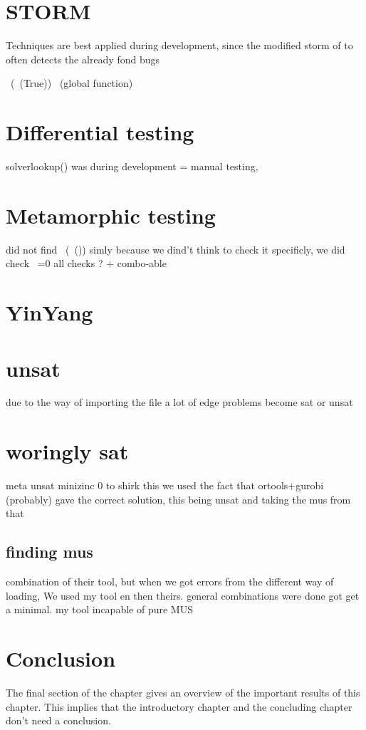 \section{STORM}
Techniques are best applied during development, since the modified storm of to often detects the already fond bugs


~(~(True))
~(global function)
\section{Differential testing}
solverlookup()  was during development = manual testing, 

\section{Metamorphic testing}
did not find ~(~()) simly because we dind't think to check it specificly, we did check ~=0
all checks ? + combo-able

\section{YinYang}


\section{unsat}
due to the way of importing the file a lot of edge problems become sat or unsat

\section{woringly sat}
meta unsat minizinc 0
to shirk this we used the fact that ortools+gurobi (probably) gave the correct solution, this being unsat and taking the mus from that


\subsection{finding mus}
combination of their tool, but when we got errors from the different way of loading, We used my tool en then theirs. general combinations were done got get a minimal. 
my tool incapable of pure MUS





\section{Conclusion}
The final section of the chapter gives an overview of the important results
of this chapter. This implies that the introductory chapter and the
concluding chapter don't need a conclusion.

